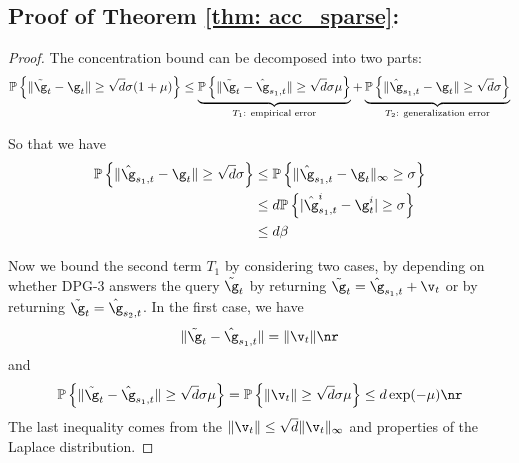     


\subsection{Proof of Theorem \ref{thm: acc_sparse}:}

\theoaccsparse*

\begin{proof}
The concentration bound can be decomposed into two parts:
\begin{align}\notag
\mathbb{P}\left\{ \|\tilde \g_t - \g_t\| \geq \sqrt{d}\sigma(1+\mu)\right\}  \leq \underbrace{ \mathbb{P}\left\{ \|\tilde \g_t - \hat \g_{s_1,t}\| \geq \sqrt{d}\sigma \mu\right\} }_{\text{$T_1$: empirical error}} +  \underbrace{\mathbb{P}\left\{ \|\hat \g_{s_1,t} - \g_t\| \geq \sqrt{d}\sigma \right\}}_{\text{$T_2$: generalization error}}
\end{align}

So that we have 
\begin{align} \notag
    \mathbb{P}\left\{ \|\hat \g_{s_1,t} - \g_t\| \geq  \sqrt{d}\sigma \right\} 
    &\leq \mathbb{P}\left\{ \|\hat \g_{s_1,t} - \g_t\|_\infty \geq  \sigma \right\} \\\notag
    &\leq d \mathbb{P}\left\{ |\hat \g_{s_1,t}^i - \g_t^i| \geq  \sigma \right\} \\\label{eq: gen2}
    &\leq d\beta 
\end{align}

Now we bound the second term $T_1$ by considering two cases, by depending on whether DPG-3 answers the query $\tilde \g_t$ by 
returning $\tilde \g_t = \hat \g_{s_1,t} + \v_t$ or by returning $\tilde \g_t = \hat \g_{s_2,t}$. In the first case, we have 
\begin{equation}
    \|\tilde \g_t - \hat \g_{s_1,t}\| = \|\v_t\| \nr
\end{equation}
and
\begin{equation}
\begin{split}
    \mathbb{P}\left\{ \|\tilde \g_t - \hat \g_{s_1,t}\| \geq \sqrt{d}\sigma \mu  \right\}  = \mathbb{P} \left\{ \|\v_t\| \geq  \sqrt{d}\sigma \mu \right\} \leq d \exp(-\mu) \nr
\end{split}
\end{equation}
The last inequality comes from the $\|\v_t\| \leq \sqrt{d}\|\v_t\|_\infty$ and properties of the Laplace distribution. 


\end{proof}
